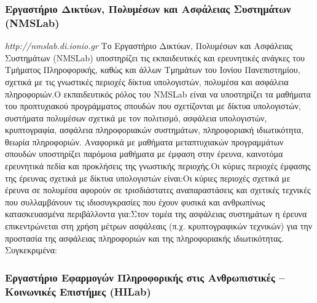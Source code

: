\hypertarget{ux3b5ux3c1ux3b3ux3b1ux3c3ux3c4ux3aeux3c1ux3b9ux3bf-ux3b4ux3b9ux3baux3c4ux3cdux3c9ux3bd-ux3c0ux3bfux3bbux3c5ux3bcux3adux3c3ux3c9ux3bd-ux3baux3b1ux3b9-ux3b1ux3c3ux3c6ux3acux3bbux3b5ux3b9ux3b1ux3c2-ux3c3ux3c5ux3c3ux3c4ux3b7ux3bcux3acux3c4ux3c9ux3bd-nmslab}{%
\subsubsection{Εργαστήριο Δικτύων, Πολυμέσων και Ασφάλειας Συστημάτων
(NMSLab)}\label{ux3b5ux3c1ux3b3ux3b1ux3c3ux3c4ux3aeux3c1ux3b9ux3bf-ux3b4ux3b9ux3baux3c4ux3cdux3c9ux3bd-ux3c0ux3bfux3bbux3c5ux3bcux3adux3c3ux3c9ux3bd-ux3baux3b1ux3b9-ux3b1ux3c3ux3c6ux3acux3bbux3b5ux3b9ux3b1ux3c2-ux3c3ux3c5ux3c3ux3c4ux3b7ux3bcux3acux3c4ux3c9ux3bd-nmslab}}

\emph{http://nmslab.di.ionio.gr} Το Εργαστήριο Δικτύων, Πολυμέσων και
Ασφάλειας Συστημάτων (NMSLab) υποστηρίζει τις εκπαιδευτικές και
ερευνητικές ανάγκες του Τμήματος Πληροφορικής, καθώς και άλλων Τμημάτων
του Ιονίου Πανεπιστημίου, σχετικά με τις γνωστικές περιοχές δίκτυα
υπολογιστών, πολυμέσα και ασφάλεια πληροφοριών.Ο εκπαιδευτικός ρόλος του
NMSLab είναι να υποστηρίζει τα μαθήματα του προπτυχιακού προγράμματος
σπουδών που σχετίζονται με δίκτυα υπολογιστών, συστήματα πολυμέσων
σχετικά με τον πολιτισμό, ασφάλεια υπολογιστών, κρυπτογραφία, ασφάλεια
πληροφοριακών συστημάτων, πληροφοριακή ιδιωτικότητα, θεωρία πληροφοριών.
Αναφορικά με μαθήματα μεταπτυχιακών προγραμμάτων σπουδών υποστηρίζει
παρόμοια μαθήματα με έμφαση στην έρευνα, καινοτόμα ερευνητικά πεδία και
προκλήσεις της γνωστικής περιοχής.Οι κύριες περιοχές έμφασης της έρευνας
σχετικά με δίκτυα υπολογιστών είναι:Οι κύριες περιοχές σχετικά με έρευνα
σε πολυμέσα αφορούν σε τρισδιάστατες αναπαραστάσεις και σχετικές
τεχνικές που συλλαμβάνουν τις ιδιοσυγκρασίες που έχουν φυσικά και
ανθρωπίνως κατασκευασμένα περιβάλλοντα για:Στον τομέα της ασφάλειας
συστημάτων η έρευνα επικεντρώνεται στη χρήση μέτρων ασφάλεαις (π.χ.
κρυπτογραφικών τεχνικών) για την προστασία της ασφάλειας πληροφοριών και
της πληροφοριακής ιδιωτικότητας. Συγκεκριμένα:

\hypertarget{ux3b5ux3c1ux3b3ux3b1ux3c3ux3c4ux3aeux3c1ux3b9ux3bf-ux3b5ux3c6ux3b1ux3c1ux3bcux3bfux3b3ux3ceux3bd-ux3c0ux3bbux3b7ux3c1ux3bfux3c6ux3bfux3c1ux3b9ux3baux3aeux3c2-ux3c3ux3c4ux3b9ux3c2-ux3b1ux3bdux3b8ux3c1ux3c9ux3c0ux3b9ux3c3ux3c4ux3b9ux3baux3adux3c2-ux3baux3bfux3b9ux3bdux3c9ux3bdux3b9ux3baux3adux3c2-ux3b5ux3c0ux3b9ux3c3ux3c4ux3aeux3bcux3b5ux3c2-hilab}{%
\subsubsection{Εργαστήριο Εφαρμογών Πληροφορικής στις Ανθρωπιστικές --
Κοινωνικές Επιστήμες
(HILab)}\label{ux3b5ux3c1ux3b3ux3b1ux3c3ux3c4ux3aeux3c1ux3b9ux3bf-ux3b5ux3c6ux3b1ux3c1ux3bcux3bfux3b3ux3ceux3bd-ux3c0ux3bbux3b7ux3c1ux3bfux3c6ux3bfux3c1ux3b9ux3baux3aeux3c2-ux3c3ux3c4ux3b9ux3c2-ux3b1ux3bdux3b8ux3c1ux3c9ux3c0ux3b9ux3c3ux3c4ux3b9ux3baux3adux3c2-ux3baux3bfux3b9ux3bdux3c9ux3bdux3b9ux3baux3adux3c2-ux3b5ux3c0ux3b9ux3c3ux3c4ux3aeux3bcux3b5ux3c2-hilab}}

